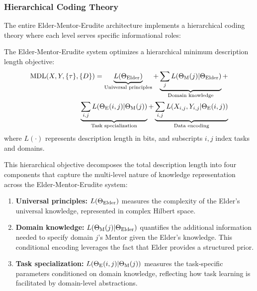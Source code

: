 \subsubsection{Hierarchical Coding Theory}

The entire Elder-Mentor-Erudite architecture implements a hierarchical coding theory where each level serves specific informational roles:

\begin{theorem}
\label{thm:hierarchical_mdl}
The Elder-Mentor-Erudite system optimizes a hierarchical minimum description length objective:
\begin{equation}
\begin{split}
\text{MDL}(X, Y, \{\tau\}, \{D\}) = \underbrace{L(\Theta_{\text{Elder}})}_{\text{Universal principles}} + \underbrace{\sum_j L(\Theta_{\text{M}}(j) | \Theta_{\text{Elder}})}_{\text{Domain knowledge}} + \\
\underbrace{\sum_{i,j} L(\Theta_{\text{E}}(i,j) | \Theta_{\text{M}}(j))}_{\text{Task specialization}} + \underbrace{\sum_{i,j} L(X_{i,j}, Y_{i,j} | \Theta_{\text{E}}(i,j))}_{\text{Data encoding}}
\end{split}
\end{equation}
where $L(\cdot)$ represents description length in bits, and subscripts $i,j$ index tasks and domains.

This hierarchical objective decomposes the total description length into four components that capture the multi-level nature of knowledge representation across the Elder-Mentor-Erudite system:

\begin{enumerate}
    \item \textbf{Universal principles:} $L(\Theta_{\text{Elder}})$ measures the complexity of the Elder's universal knowledge, represented in complex Hilbert space.
    
    \item \textbf{Domain knowledge:} $L(\Theta_{\text{M}}(j) | \Theta_{\text{Elder}})$ quantifies the additional information needed to specify domain $j$'s Mentor given the Elder's knowledge. This conditional encoding leverages the fact that Elder provides a structured prior.
    
    \item \textbf{Task specialization:} $L(\Theta_{\text{E}}(i,j) | \Theta_{\text{M}}(j))$ measures the task-specific parameters conditioned on domain knowledge, reflecting how task learning is facilitated by domain-level abstractions.
    

\end{enumerate}
\end{theorem}
